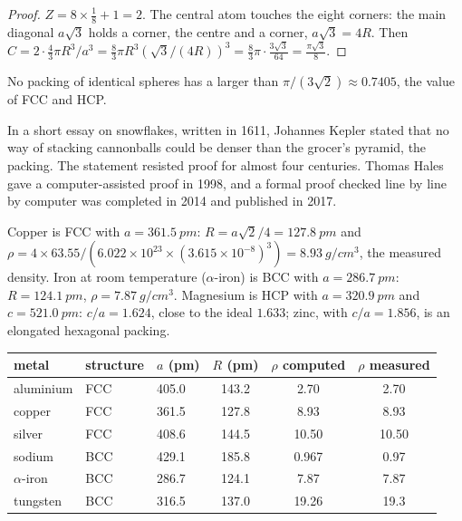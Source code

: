 \begin{proof}
$Z = 8 \times \frac18 + 1 = 2$. The central atom touches the eight
corners: the main diagonal $a\sqrt3$ holds a corner, the centre and a
corner, $a\sqrt3 = 4R$. Then $C = 2 \cdot \frac43\pi R^3/a^3 =
\frac83\pi R^3 (\sqrt3/(4R))^3 = \frac83\pi \cdot \frac{3\sqrt3}{64} =
\frac{\pi\sqrt3}{8}$.
\end{proof}

\begin{proposition}\label{prop:b1:crystals-metals:kepler}
No packing of identical spheres has a  larger than
$\pi/(3\sqrt2) \approx 0.7405$, the value of FCC and HCP.
\end{proposition}
\admitted

\begin{history}
In a short essay on snowflakes, written in 1611, Johannes Kepler stated
that no way of stacking cannonballs could be denser than the grocer's
pyramid, the  packing. The statement resisted proof for
almost four centuries. Thomas Hales gave a computer-assisted proof in
1998, and a formal proof checked line by line by computer was completed in
2014 and published in 2017.
\end{history}

\begin{example}\label{ex:b1:crystals-metals:metals}
Copper is FCC with $a = \qty{361.5}{pm}$: $R = a\sqrt2/4 =
\qty{127.8}{pm}$ and $\rho = 4 \times 63.55/(6.022 \times 10^{23} \times
(3.615 \times 10^{-8})^3) = \qty{8.93}{g/cm^3}$, the measured density.
Iron at room temperature ($\alpha$-iron) is BCC with $a = \qty{286.7}{pm}$:
$R = \qty{124.1}{pm}$, $\rho = \qty{7.87}{g/cm^3}$. Magnesium is HCP with
$a = \qty{320.9}{pm}$ and $c = \qty{521.0}{pm}$: $c/a = 1.624$, close to
the ideal $1.633$; zinc, with $c/a = 1.856$, is an elongated hexagonal
packing.
\end{example}

\begin{center}
\small
\begin{tabular}{lllccc}
\hline
metal & structure & $a$ (pm) & $R$ (pm) & $\rho$ computed & $\rho$ measured \\
\hline
aluminium & FCC & 405.0 & 143.2 & 2.70 & 2.70 \\
copper & FCC & 361.5 & 127.8 & 8.93 & 8.93 \\
silver & FCC & 408.6 & 144.5 & 10.50 & 10.50 \\
sodium & BCC & 429.1 & 185.8 & 0.967 & 0.97 \\
$\alpha$-iron & BCC & 286.7 & 124.1 & 7.87 & 7.87 \\
tungsten & BCC & 316.5 & 137.0 & 19.26 & 19.3 \\
\hline
\end{tabular}
\end{center}


